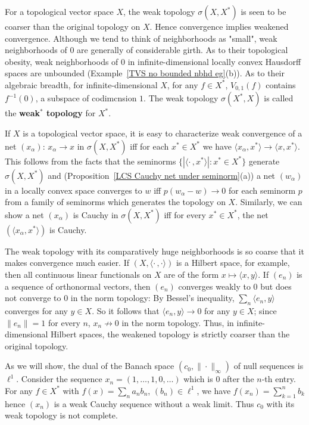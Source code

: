 For a topological vector space $X$, the weak topology $\sigma(X,X^*)$ is seen to be coarser than the original topology on $X$. Hence convergence implies weakened convergence. Although we tend to think of neighborhoods as "small", weak neighborhoods of $0$ are generally of considerable girth. As to their topological obesity, weak neighborhoods of $0$ in infinite-dimensional locally convex Hausdorff spaces are unbounded (Example~\ref{TVS no bounded nbhd eg}(b)). As to their algebraic breadth, for infinite-dimensional $X$, for any $f\in X^*$, $V_{0,1}(f)$ contains $f^{-1}(0)$, a subspace of codimcnsion $1$. The weak topology $\sigma(X^*,X)$ is called the \textbf{weak$^*$ topology} for $X^*$.
\begin{example}
If $X$ is a topological vector space, it is easy to characterize weak convergence of a net $(x_\alpha)$: $x_\alpha\to x$ in $\sigma(X,X^*)$ iff for each $x^*\in X^*$ we have $\langle x_\alpha,x^*\rangle\to \langle x,x^*\rangle$. This follows from the facts that the seminorms $\{|\langle\cdot\,,x^*\rangle|:x^*\in X^*\}$ generate $\sigma(X,X^*)$ and (Proposition~\ref{LCS Cauchy net under seminorm}(a)) a net $(w_\alpha)$ in a locally convex space converges to $w$ iff $p(w_\alpha-w)\to 0$ for each seminorm $p$ from a family of seminorms which generates the topology on $X$. Similarly, we can show a net $(x_\alpha)$ is Cauchy in $\sigma(X,X^*)$ iff for every $x^*\in X^*$, the net $(\langle x_\alpha,x^*\rangle)$ is Cauchy.\par
The weak topology with its comparatively huge neighborhoods is so coarse that it makes convergence much easier. If $(X,\langle\cdot\,,\cdot\rangle)$ is a Hilbert space, for example, then all continuous linear functionals on $X$ are of the form $x\mapsto\langle x,y\rangle$. If $(e_n)$ is a sequence of orthonormal vectors, then $(e_n)$ converges weakly to $0$ but does not converge to $0$ in the norm topology: By Bessel's inequality, $\sum_n\langle e_n,y\rangle$ converges for any $y\in X$. So it follows that $\langle e_n,y\rangle\to 0$ for any $y\in X$; since $\|e_n\|=1$ for every $n$, $x_n\not\to 0$ in the norm topology. Thus, in infinite-dimensional Hilbert spaces, the weakened topology is strictly coarser than the original topology.
\end{example}
\begin{example}
As we will show, the dual of the Banach space $(c_0,\|\cdot\|_\infty)$ of null sequences is $\ell^1$. Consider the sequence $x_n=(1,\dots,1,0,\dots)$ which is $0$ after the $n$-th entry. For any $f\in X^*$ with $f(x)=\sum_na_nb_n$, $(b_n)\in\ell^1$, we have $f(x_n)=\sum_{k=1}^{n}b_k$ hence $(x_n)$ is a weak Cauchy sequence without a weak limit. Thus $c_0$ with its weak topology is not complete.
\end{example}
